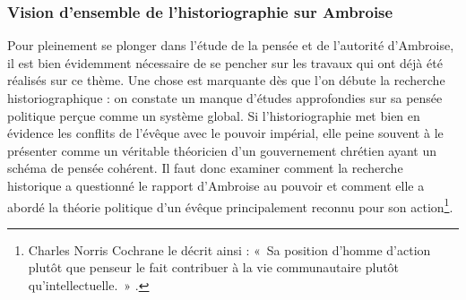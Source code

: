\bigskip

\subsubsection*{Vision d'ensemble de l'historiographie sur Ambroise}

Pour pleinement se plonger dans l'étude de la pensée et de l'autorité d'Ambroise, il est bien évidemment nécessaire de se pencher sur les travaux qui ont déjà été réalisés sur ce thème. Une chose est marquante dès que l'on débute la recherche historiographique : on constate un manque d'études approfondies sur sa pensée politique perçue comme un système global. Si l'historiographie met bien en évidence les conflits de l'évêque avec le pouvoir impérial, elle peine souvent à le présenter comme un véritable théoricien d'un gouvernement chrétien ayant un schéma de pensée cohérent. Il faut donc examiner comment la recherche historique a questionné le rapport d'Ambroise au pouvoir et comment elle a abordé la théorie politique d'un évêque principalement reconnu pour son action\footnote{Charles Norris Cochrane le décrit ainsi : «~Sa position d'homme d'action plutôt que penseur le fait contribuer à la vie communautaire plutôt qu'intellectuelle.~» \cite[373]{cochrane_christianity}.}.

\bigskip


